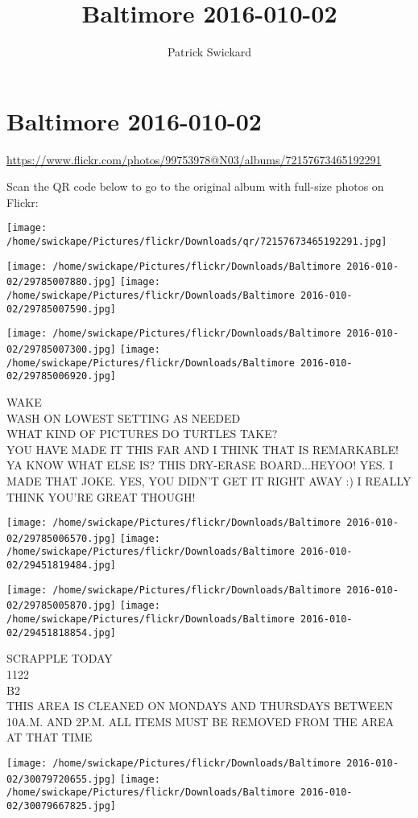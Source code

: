 \documentclass[10pt,letterpaper]{article}
\title{Baltimore 2016-010-02}
\author{Patrick Swickard}
\date{}
\begin{document}
\section*{Baltimore 2016-010-02}

\url{https://www.flickr.com/photos/99753978@N03/albums/72157673465192291}

Scan the QR code below to go to the original album with full-size photos on Flickr:

\texttt{[image: /home/swickape/Pictures/flickr/Downloads/qr/72157673465192291.jpg]}
\pagebreak

\texttt{[image: /home/swickape/Pictures/flickr/Downloads/Baltimore 2016-010-02/29785007880.jpg]}
\texttt{[image: /home/swickape/Pictures/flickr/Downloads/Baltimore 2016-010-02/29785007590.jpg]}

\texttt{[image: /home/swickape/Pictures/flickr/Downloads/Baltimore 2016-010-02/29785007300.jpg]}
\texttt{[image: /home/swickape/Pictures/flickr/Downloads/Baltimore 2016-010-02/29785006920.jpg]}

WAKE\\
WASH ON LOWEST SETTING AS NEEDED\\
WHAT KIND OF PICTURES DO TURTLES TAKE?\\
YOU HAVE MADE IT THIS FAR AND I THINK THAT IS REMARKABLE!  YA KNOW WHAT ELSE IS?  THIS DRY{-}ERASE BOARD...HEYOO! YES.  I MADE THAT JOKE.  YES, YOU DIDN'T GET IT RIGHT AWAY :) I REALLY THINK YOU'RE GREAT THOUGH!
\pagebreak

\texttt{[image: /home/swickape/Pictures/flickr/Downloads/Baltimore 2016-010-02/29785006570.jpg]}
\texttt{[image: /home/swickape/Pictures/flickr/Downloads/Baltimore 2016-010-02/29451819484.jpg]}

\texttt{[image: /home/swickape/Pictures/flickr/Downloads/Baltimore 2016-010-02/29785005870.jpg]}
\texttt{[image: /home/swickape/Pictures/flickr/Downloads/Baltimore 2016-010-02/29451818854.jpg]}

SCRAPPLE TODAY\\
1122\\
B2\\
THIS AREA IS CLEANED ON MONDAYS AND THURSDAYS BETWEEN 10A.M. AND 2P.M. ALL ITEMS MUST BE REMOVED FROM THE AREA AT THAT TIME
\pagebreak

\texttt{[image: /home/swickape/Pictures/flickr/Downloads/Baltimore 2016-010-02/30079720655.jpg]}
\texttt{[image: /home/swickape/Pictures/flickr/Downloads/Baltimore 2016-010-02/30079667825.jpg]}
\end{document}
